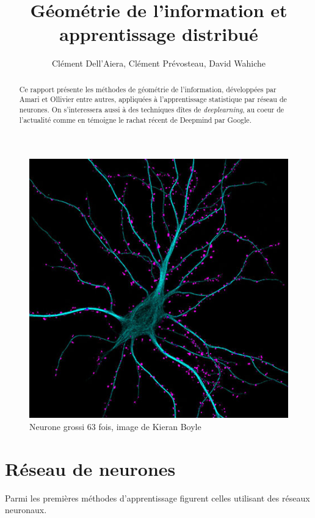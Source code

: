 \documentclass{article}
\title{Géométrie de l'information et apprentissage distribué}
\author{Clément Dell'Aiera, Clément Prévosteau, David Wahiche}
\date{}
\theoremstyle{definition}
\begin{document}
\maketitle

\begin{figure}[h]\centering
\includegraphics[scale=0.6]{Neurone.jpg}
\caption{Neurone grossi 63 fois, image de Kieran Boyle}
\label{fig:Neurone}
\end{figure}

\newpage
\tableofcontents

\newpage
\begin{abstract}
Ce rapport présente les méthodes de géométrie de l'information, développées par Amari et Ollivier entre autres, appliquées à l'apprentissage statistique par réseau de neurones. On s'interessera aussi à des techniques dîtes de \textit{deeplearning}, au coeur de l'actualité comme en témoigne le rachat récent de Deepmind par Google.
\end{abstract}
\section{Réseau de neurones}
Parmi les premières méthodes d'apprentissage figurent celles utilisant des réseaux neuronaux. %
\end{document}
